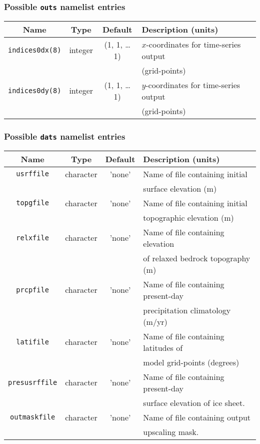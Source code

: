 \documentclass[11pt]{article}
\begin{document}
\subsubsection{Possible \texttt{outs} namelist entries}
%
\begin{center}
\begin{tabular}{|c|c|c|l|}
\hline
Name & Type & Default & Description (units)\\
\hline
\hline
\texttt{indices0dx(8)} & integer & (1, 1, \ldots 1) & $x$-coordinates for
time-series output \\
 & & & (grid-points) \\
\hline
\texttt{indices0dy(8)} & integer & (1, 1, \ldots 1) & $y$-coordinates for
time-series output \\
 & & & (grid-points) \\
\hline
\end{tabular}
\end{center}
%
\subsubsection{Possible \texttt{dats} namelist entries}
%
\begin{center}
\begin{tabular}{|c|c|c|l|}
\hline
Name & Type & Default & Description (units)\\
\hline
\hline
\texttt{usrffile} & character & 'none' & Name of file containing initial  \\
 & & & surface elevation (m) \\
\hline
\texttt{topgfile} & character & 'none' & Name of file containing initial \\
 & & & topographic elevation (m) \\
\hline
\texttt{relxfile} & character & 'none' & Name of file containing elevation \\
 & & & of relaxed bedrock topography (m) \\ 
\hline
\texttt{prcpfile} & character & 'none' & Name of file containing present-day \\
 & & & precipitation climatology (m/yr) \\
\hline
\texttt{latifile} & character & 'none' & Name of file containing latitudes of
\\
 & & & model grid-points (degrees) \\
\hline
\texttt{presusrffile} & character & 'none' & Name of file containing
present-day \\
 & & & surface elevation of ice sheet. \\
\hline
\texttt{outmaskfile} & character & 'none' & Name of file containing output \\
 & & & upscaling mask. \\ 
\hline
\end{tabular}
\end{center}
%
\end{document}

